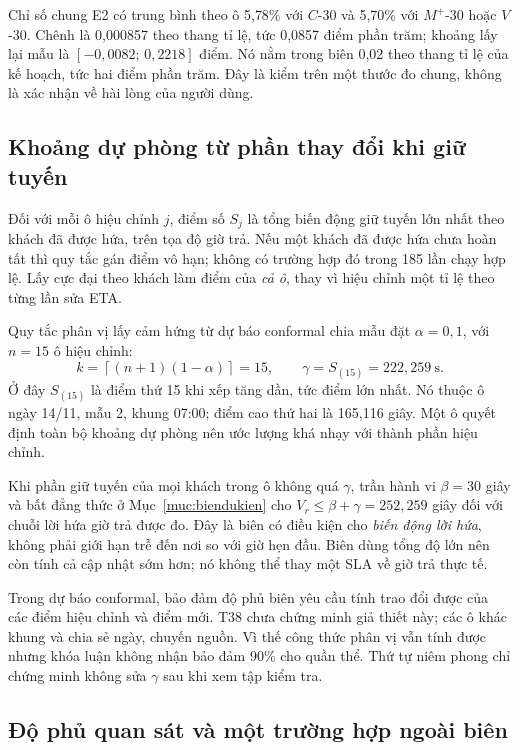 Chỉ số chung E2 có trung bình theo ô 5,78\% với $C$-30 và 5,70\% với
$M^{+}$-30 hoặc $V$-30. Chênh là 0,000857 theo thang tỉ lệ, tức 0,0857
điểm phần trăm; khoảng lấy lại mẫu là $[-0{,}0082;\,0{,}2218]$ điểm.
Nó nằm trong biên 0,02 theo thang tỉ lệ của kế hoạch, tức hai điểm phần trăm.
Đây là kiểm trên một thước đo chung, không là xác nhận về hài lòng của người dùng.

\subsection{Khoảng dự phòng từ phần thay đổi khi giữ tuyến}

Đối với mỗi ô hiệu chỉnh $j$, điểm số $S_j$ là tổng biến động giữ tuyến lớn
nhất theo khách đã được hứa, trên tọa độ giờ trả. Nếu một khách đã được hứa
chưa hoàn tất thì quy tắc gán điểm vô hạn; không có trường hợp đó trong 185
lần chạy hợp lệ. Lấy cực đại theo khách làm điểm của \emph{cả ô}, thay vì
hiệu chỉnh một tỉ lệ theo từng lần sửa ETA.

Quy tắc phân vị lấy cảm hứng từ dự báo conformal chia mẫu
\cite{angelopoulos2023} đặt $\alpha=0{,}1$, với $n=15$ ô hiệu chỉnh:
\begin{equation}
 k=\left\lceil(n+1)(1-\alpha)\right\rceil=15,\qquad
 \gamma=S_{(15)}=222{,}259\ \text{s}.
\end{equation}
Ở đây $S_{(15)}$ là điểm thứ 15 khi xếp tăng dần, tức điểm lớn nhất. Nó thuộc
ô ngày 14/11, mẫu 2, khung 07:00; điểm cao thứ hai là 165,116 giây. Một ô
quyết định toàn bộ khoảng dự phòng nên ước lượng khá nhạy với thành phần hiệu chỉnh.

Khi phần giữ tuyến của mọi khách trong ô không quá $\gamma$, trần hành vi
$\beta=30$ giây và bất đẳng thức ở Mục~\ref{muc:biendukien} cho
$V_r\le\beta+\gamma=252{,}259$ giây đối với chuỗi lời hứa giờ trả được đo.
Đây là biên có điều kiện cho \emph{biến động lời hứa}, không phải giới hạn
trễ đến nơi so với giờ hẹn đầu. Biên dùng tổng độ lớn nên còn tính cả cập
nhật sớm hơn; nó không thể thay một SLA về giờ trả thực tế.

Trong dự báo conformal, bảo đảm độ phủ biên yêu cầu tính trao đổi được của
các điểm hiệu chỉnh và điểm mới. T38 chưa chứng minh giả thiết này; các ô
khác khung và chia sẻ ngày, chuyến nguồn. Vì thế công thức phân vị vẫn tính
được nhưng khóa luận không nhận bảo đảm 90\% cho quần thể. Thứ tự niêm phong
chỉ chứng minh không sửa $\gamma$ sau khi xem tập kiểm tra.

\subsection{Độ phủ quan sát và một trường hợp ngoài biên}

